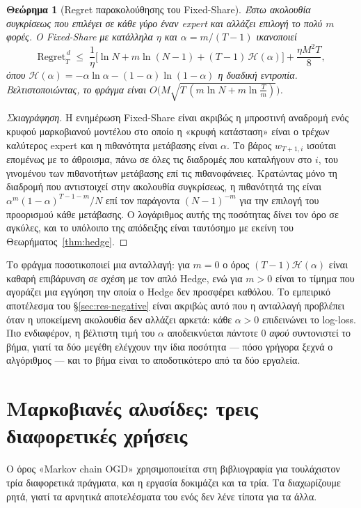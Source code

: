 \documentclass[12pt,a4paper,oneside]{report}
\renewcommand{\_}{\oldunderscore\allowbreak}
\theoremstyle{definition}
\theoremstyle{plain}
\newtheorem{theorem}{Θεώρημα}[chapter]
\theoremstyle{remark}
\begin{document}
\begin{theorem}[Regret παρακολούθησης του Fixed-Share]
\label{thm:fixed-share}
Έστω ακολουθία συγκρίσεως που επιλέγει σε κάθε γύρο έναν expert και αλλάζει επιλογή το πολύ
$m$ φορές. Ο Fixed-Share με κατάλληλα $\eta$ και $\alpha = m/(T-1)$ ικανοποιεί
\[
\mathrm{Regret}_T^{\,d} \;\leq\; \frac{1}{\eta}\Big[ \ln N + m \ln(N-1)
+ (T-1)\,\mathcal{H}(\alpha) \Big] + \frac{\eta M^2 T}{8},
\]
όπου $\mathcal{H}(\alpha) = -\alpha\ln\alpha - (1-\alpha)\ln(1-\alpha)$ η δυαδική εντροπία.
Βελτιστοποιώντας, το φράγμα είναι $O\big(M\sqrt{T\,(m\ln N + m\ln\frac{T}{m})}\big)$.
\end{theorem}

\begin{proof}[Σκιαγράφηση]
Η ενημέρωση Fixed-Share είναι ακριβώς η μπροστινή αναδρομή ενός κρυφού μαρκοβιανού μοντέλου
στο οποίο η «κρυφή κατάσταση» είναι ο τρέχων καλύτερος expert και η πιθανότητα μετάβασης
είναι $\alpha$. Το βάρος $w_{T+1,i}$ ισούται επομένως με το άθροισμα, πάνω σε όλες τις
διαδρομές που καταλήγουν στο $i$, του γινομένου των πιθανοτήτων μετάβασης επί τις
πιθανοφάνειες. Κρατώντας μόνο τη διαδρομή που αντιστοιχεί στην ακολουθία συγκρίσεως, η
πιθανότητά της είναι $\alpha^{m}(1-\alpha)^{T-1-m}/N$ επί τον παράγοντα $(N-1)^{-m}$ για την
επιλογή του προορισμού κάθε μετάβασης. Ο λογάριθμος αυτής της ποσότητας δίνει τον όρο σε
αγκύλες, και το υπόλοιπο της απόδειξης είναι ταυτόσημο με εκείνη του
Θεωρήματος~\ref{thm:hedge}.
\end{proof}

Το φράγμα ποσοτικοποιεί μια ανταλλαγή: για $m=0$ ο όρος $(T-1)\mathcal{H}(\alpha)$ είναι
καθαρή επιβάρυνση σε σχέση με τον απλό Hedge, ενώ για $m>0$ είναι το τίμημα που αγοράζει μια
εγγύηση την οποία ο Hedge δεν προσφέρει καθόλου. Το εμπειρικό αποτέλεσμα του
\S\ref{sec:res-negative} είναι ακριβώς αυτό που η ανταλλαγή προβλέπει όταν η υποκείμενη
ακολουθία δεν αλλάζει αρκετά: κάθε $\alpha>0$ επιδεινώνει το log-loss. Πιο ενδιαφέρον, η
βέλτιστη τιμή του $\alpha$ αποδεικνύεται πάντοτε $0$ \emph{αφού} συντονιστεί το βήμα, γιατί
τα δύο μεγέθη ελέγχουν την ίδια ποσότητα --- πόσο γρήγορα ξεχνά ο αλγόριθμος --- και το βήμα
είναι το αποδοτικότερο από τα δύο εργαλεία.

\section{Μαρκοβιανές αλυσίδες: τρεις διαφορετικές χρήσεις}
\label{sec:markov-theory}

Ο όρος «Markov chain OGD» χρησιμοποιείται στη βιβλιογραφία για τουλάχιστον τρία διαφορετικά
πράγματα, και η εργασία δοκιμάζει και τα τρία. Τα διαχωρίζουμε ρητά, γιατί τα αρνητικά
αποτελέσματα του ενός δεν λένε τίποτα για τα άλλα.
\end{document}
